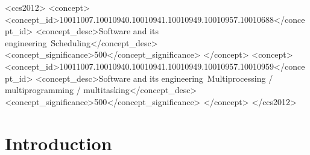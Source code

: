 \documentclass[sigconf,review,anonymous]{acmart}
\begin{document}
\begin{CCSXML}
<ccs2012>
   <concept>
       <concept_id>10011007.10010940.10010941.10010949.10010957.10010688</concept_id>
       <concept_desc>Software and its engineering~Scheduling</concept_desc>
       <concept_significance>500</concept_significance>
       </concept>
   <concept>
       <concept_id>10011007.10010940.10010941.10010949.10010957.10010959</concept_id>
       <concept_desc>Software and its engineering~Multiprocessing / multiprogramming / multitasking</concept_desc>
       <concept_significance>500</concept_significance>
       </concept>
 </ccs2012>
\end{CCSXML}





\maketitle

\section{Introduction}
\label{section: introduction}
\end{document}
